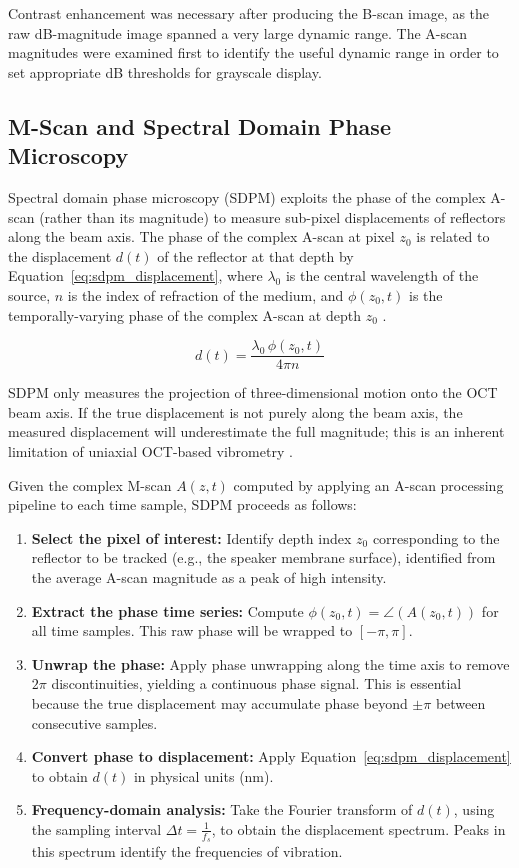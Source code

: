 \documentclass[10pt]{article}
\begin{document}
Contrast enhancement was necessary after producing the B-scan image, as the raw dB-magnitude image spanned a very large dynamic range. The A-scan magnitudes were examined first to identify the useful dynamic range in order to set appropriate dB thresholds for grayscale display. 


\subsection{M-Scan and Spectral Domain Phase Microscopy}

Spectral domain phase microscopy (SDPM) exploits the phase of the complex A-scan (rather than its magnitude) to measure sub-pixel displacements of reflectors along the beam axis. The phase of the complex A-scan at pixel $z_0$ is related to the displacement $d(t)$ of the reflector at that depth by Equation~\ref{eq:sdpm_displacement}, where $\lambda_0$ is the central wavelength of the source, $n$ is the index of refraction of the medium, and $\phi(z_0, t)$ is the temporally-varying phase of the complex A-scan at depth $z_0$ \cite{brianlfrostthesis}.

\begin{equation}
d(t) = \frac{\lambda_0 \, \phi(z_0, t)}{4\pi n}
\label{eq:sdpm_displacement}
\end{equation}

SDPM only measures the projection of three-dimensional motion onto the OCT beam axis. If the true displacement is not purely along the beam axis, the measured displacement will underestimate the full magnitude; this is an inherent limitation of uniaxial OCT-based vibrometry \cite{brianlfrostthesis}.

Given the complex M-scan $A(z, t)$ computed by applying an A-scan processing 
pipeline to each time sample, SDPM proceeds as follows:
\begin{enumerate}
  \item \textbf{Select the pixel of interest:} Identify depth index $z_0$ corresponding to the reflector to be tracked (e.g., the speaker membrane surface), identified from the average A-scan magnitude as a peak of high intensity.
  \item \textbf{Extract the phase time series:} Compute $\phi(z_0, t) = \angle(A(z_0, t))$ for all time samples. This raw phase will be wrapped to $[-\pi, \pi]$.
  \item \textbf{Unwrap the phase:} Apply phase unwrapping along the time axis to remove $2\pi$ discontinuities, yielding a continuous phase signal. This is essential because the true displacement may accumulate phase beyond $\pm \pi$ between consecutive samples.
  \item \textbf{Convert phase to displacement:} Apply Equation~\ref{eq:sdpm_displacement} to obtain $d(t)$ in physical units (nm).
  \item \textbf{Frequency-domain analysis:} Take the Fourier transform of $d(t)$, using the sampling interval $\Delta t = \frac{1}{f_s}$, to obtain the displacement spectrum. Peaks in this spectrum identify the frequencies of vibration.
\end{enumerate}
\end{document}
